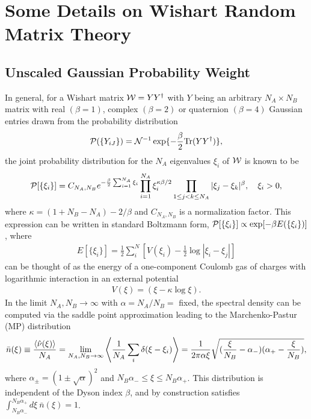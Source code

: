 \documentclass[aps,prb,preprint,onecolumn,amsmath,amssymb,superscriptaddress,eqsecnum,floatfix,scrartcl]{revtex4-1}
\begin{document}
\section{Some Details on Wishart Random Matrix Theory}
\label{AppendixSectionDetailsWishartRandomMatrixTheory}

\subsection{Unscaled Gaussian Probability Weight}
\label{AppendixSubSectionUnscaledGaussian}
 In general, for a Wishart matrix ${\cal W}=YY^{\dag}$ with $Y$ being an arbitrary $N_A\times N_B$ matrix with real $(\beta=1)$, complex $(\beta=2)$ or quaternion $(\beta=4)$ Gaussian entries drawn from the
probability distribution
\begin{eqnarray}
\label{WishartGaussianDistributionCal}
{\cal P}(\{Y_{iJ}\})
=
{\cal N}^{-1}
\exp  \{ - {\beta\over 2}  \mbox{Tr}(Y Y^\dagger) \},
\end{eqnarray}
the 
joint probability 
 distribution for the $N_A$ eigenvalues  ${\xi}_i$ of  
${\cal W}$ is known to be\cite{loggas}
\begin{eqnarray}
\label{JointProbabilityxi}
{\cal P}[\{\xi_i\}]=C_{N_A,N_B}e^{-\frac{\beta}{2}\sum_{i=1}^{N_A}\xi_i}\prod_{i=1}^{N_A} \xi_{i}^{\kappa\beta/2}\prod_{1\leq j<k\leq N_A}
|\xi_j-\xi_k|^{\beta},\quad \xi_i>0,
\end{eqnarray}
where $\kappa=(1+N_B-N_A)-2/\beta$ and $C_{N_A,N_B}$ is a normalization factor. This 
expression
can be written in standard Boltzmann form, ${\cal P}[\{\xi_i\}]\propto \exp[-\beta E(\{\xi_i\})]$, where
\begin{align}
E[\{\xi_i\}]=\frac{1}{2}\sum_i^N
\left [ 
V(\xi_i) -\frac{1}{2}\log|\xi_i-\xi_j|
\right ]
\label{Appendixlog_gas}
\end{align}
can be
thought of
as the energy of a  one-component Coulomb gas of charges with 
logarithmic interaction 
in an  external potential 
\begin{eqnarray}
\label{WishartPotential}
V(\xi)=(\xi-\kappa \log \xi).
\end{eqnarray}
In the limit $N_A, N_B \to \infty$  with $\alpha=N_A/N_B=$ fixed,
the spectral density can be computed via the saddle point approximation leading to the Marchenko-Pastur (MP)
distribution
\begin{eqnarray}
\label{MPDistributionCal}
\bar{n}(\xi)
 \equiv 
{ \langle {\hat \nu}(\xi)\rangle\over N_A}
=\lim_{N_A, N_B \to \infty}
\left \langle {1\over N_A} \sum_i \delta (\xi-\xi_i) \right \rangle=
{1\over 2 \pi \alpha \xi}
\sqrt{ ({\xi\over N_B}
-\alpha_- )
(\alpha_+ - {\xi\over N_B})}, 
\end{eqnarray}
where $\alpha_{\pm} = (1\pm \sqrt{\alpha})^2$
and
$N_B \alpha_- \leq \xi \leq N_B \alpha_+$. This distribution is independent of the Dyson index $\beta$, and by construction satisfies
$\int_{N_B \alpha_-}^{N_B \alpha_+}  d \xi \  \bar{n}(\xi) =1$.
\end{document}

